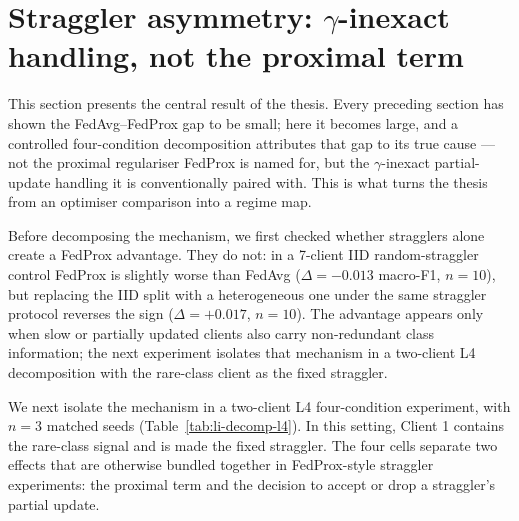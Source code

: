 \documentclass[11pt,a4paper]{report}
\begin{document}
\section{Straggler asymmetry: \texorpdfstring{$\gamma$}{gamma}-inexact handling, not the proximal term}
\label{sec:li-straggler}

This section presents the central result of the thesis. Every preceding
section has shown the FedAvg--FedProx gap to be small; here it becomes
large, and a controlled four-condition decomposition attributes that gap
to its true cause --- not the proximal regulariser FedProx is named for,
but the $\gamma$-inexact partial-update handling it is conventionally
paired with. This is what turns the thesis from an optimiser comparison
into a regime map.

Before decomposing the mechanism, we first checked whether stragglers alone
create a FedProx advantage. They do not: in a 7-client IID random-straggler
control FedProx is slightly worse than FedAvg ($\Delta = -0.013$ macro-F1,
$n = 10$), but replacing the IID split with a heterogeneous one under the same
straggler protocol reverses the sign ($\Delta = +0.017$, $n = 10$). The advantage
appears only when slow or partially updated clients also carry non-redundant
class information; the next experiment isolates that mechanism in a two-client L4
decomposition with the rare-class client as the fixed straggler.

We next isolate the mechanism in a two-client L4 four-condition experiment,
with $n=3$ matched seeds (Table~\ref{tab:li-decomp-l4}). In this setting,
Client 1 contains the rare-class signal and is made the fixed straggler. The
four cells separate two effects that are otherwise bundled together in
FedProx-style straggler experiments: the proximal term and the decision to
accept or drop a straggler's partial update.
\end{document}
